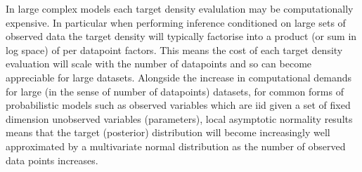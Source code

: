 In large complex models each target density evalulation may be computationally expensive. In particular when performing inference conditioned on large sets of observed data the target density will typically factorise into a product (or sum in log space) of per datapoint factors. This means the cost of each target density evaluation will scale with the number of datapoints and so can become appreciable for large datasets. Alongside the increase in computational demands for large (in the sense of number of datapoints) datasets, for common forms of probabilistic models such as observed variables which are \ac{iid} given a set of fixed dimension unobserved variables (parameters), local asymptotic normality results means that the target (posterior) distribution will become increasingly well approximated by a multivariate normal distribution as the number of  observed data points increases. %


